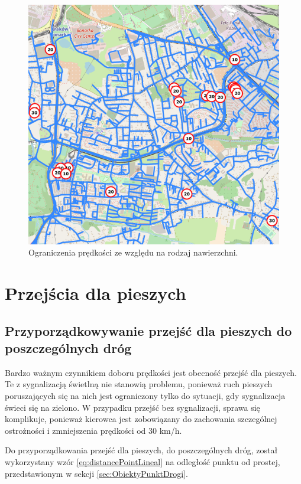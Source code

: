 \begin{figure}[h]
\caption{Ograniczenia prędkości ze względu na rodzaj nawierzchni.}
\label{sec:surfaceTypePhoto}
\centering
\includegraphics[width=1\textwidth]{surfaceType}
\end{figure}

\newpage
\section{Przejścia dla pieszych}
\label{sec:pedestrialCrossing}
\subsection{Przyporządkowywanie przejść dla pieszych do poszczególnych dróg}

Bardzo ważnym czynnikiem doboru prędkości jest obecność przejść dla pieszych. Te z sygnalizacją świetlną nie stanowią problemu, ponieważ ruch pieszych poruszających się na nich jest ograniczony tylko do sytuacji, gdy sygnalizacja świeci się na zielono. W przypadku przejść bez sygnalizacji, sprawa się komplikuje, ponieważ kierowca jest zobowiązany do zachowania szczególnej ostrożności i zmniejszenia prędkości od 30 km/h.

Do przyporządkowania przejść dla pieszych, do poszczególnych dróg, został wykorzystany wzór \ref{eq:distancePointLineal} na odległość punktu od prostej, przedstawionym w sekcji \ref{sec:ObiektyPunktDrogi}.


